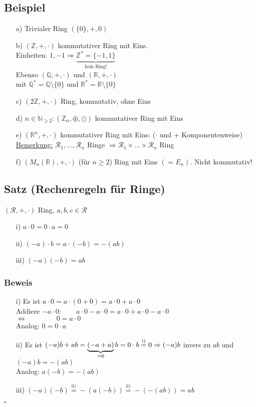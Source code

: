 \documentclass[12pt,titlepage, pdf]{article}
\newcommand{\R}{\mathds{R}}
\newcommand{\uline}[1]{\underline{#1}}
\renewcommand{\>}{\rightarrow}
\renewcommand{\*}{\cdot}
\begin{document}
\subsection{Beispiel}
\begin{itemize}
	\item[a)] Trivialer Ring $(\{0\},+,0)$
	\item[b)] $(\mathbb{Z}, +,\cdot)$ kommutativer Ring mit Eins. \\
	Einheiten: $1, -1\Rightarrow \underbrace{\mathbb{Z}^* = \{-1,1\}}_{\text{kein Ring!}}$\\
	Ebenso $(\mathbb{Q},+,\cdot)$ und $(\mathbb{R},+,\cdot)$ \\
	mit $\mathbb{Q}^* = \mathbb{Q} \setminus \{0\}$ und $\mathbb{R}^* =  \mathbb{R} \setminus \{0\}$
	\item[c)] $(2\mathbb{Z},+,\cdot)$ Ring, kommutativ, ohne Eins
	\item[d)] $n \in \mathbb{N}_{\geq 2}: (\mathbb{Z}_n, \oplus, \odot)$ kommutativer Ring mit Eins
	\item[e)] $(\R^n, + ,\cdot)$ kommutativer Ring mit Eins: ($\cdot$ und + Komponentenweise)\\
	\uline{Bemerkung:} $\mathcal{R}_1,...,\mathcal{R}_n$ Ringe $\Rightarrow \mathcal{R}_1 \times ... \times \mathcal{R}_n$ Ring
	\item[f)] $(M_n(\R),+, \cdot)$ (für $n\geq 2$) Ring mit Eins $(= E_n)$. Nicht kommutativ! 
\end{itemize}
\subsection{Satz (Rechenregeln für Ringe)}
\label{4.3}
$(\mathcal{R}, +,\cdot)$ Ring, $a,b,c \in \mathcal{R}$
\begin{itemize}
	\item[i)] $a \cdot 0 = 0 \cdot a = 0$
	\item[ii)] $(-a) \cdot b = a \cdot (-b) = -(ab)$
	\item[iii)] $(-a)(-b) = ab$
\end{itemize}	
\subsubsection*{Beweis}
\begin{itemize}
	\item[i)] Es ist $a \cdot 0 = a \cdot (0 + 0)= a \cdot 0 + a \cdot 0$\\
	Addiere $-a \cdot 0:\qquad a \cdot 0 - a \cdot 0 = a \cdot 0 + a \cdot 0 - a \cdot 0 $\\
	\noindent\hspace*{30mm}$\Leftrightarrow \qquad\qquad~0 = a \cdot 0$\\
	Analog: $0 = 0 \cdot a$
	\item[ii)] Es ist $(-a)b + ab = \underbrace{(-a+a)}_{=0}b = 0 \cdot b \overset{\textrm{i)}}{=} 0\\
	\Rightarrow (-a)b$ invers zu $ab$ und $(-a)b = -(ab)$ \\
	Analog: $a(-b) = -(ab)$
	\item[iii)] $(-a)(-b) \overset{\textrm{ii)}}{=} -(a(-b)) \overset{\textrm{ii)}}{=} -(-(ab)) = ab$
\end{itemize}
\hfill$\square$
\end{document}
